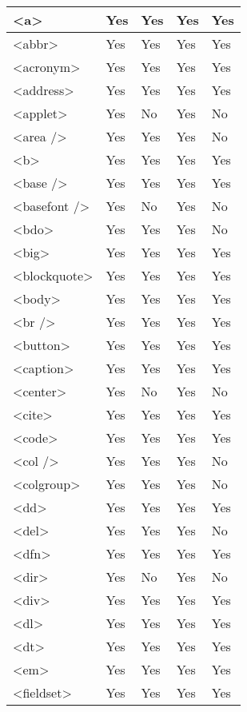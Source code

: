 \begin{longtable}{|p{70pt}|p{70pt}|p{70pt}|p{70pt}|p{70pt}|}
\endlastfoot
\hline
<a>					&Yes			&Yes	&Yes				&Yes	\\
\hline
<abbr>				&Yes			&Yes	&Yes				&Yes	\\
\hline
<acronym>			&Yes			&Yes	&Yes				&Yes	\\
\hline
<address>			&Yes			&Yes	&Yes				&Yes	\\
\hline
<applet>				&Yes			&No		&Yes				&No		\\
\hline
<area />				&Yes			&Yes	&Yes				&No		\\
\hline
<b>					&Yes			&Yes	&Yes				&Yes	\\
\hline
<base />				&Yes			&Yes	&Yes				&Yes	\\
\hline
<basefont />			&Yes			&No		&Yes				&No		\\
\hline
<bdo>				&Yes			&Yes	&Yes				&No		\\
\hline
<big>				&Yes			&Yes	&Yes				&Yes	\\
\hline
<blockquote>			&Yes			&Yes	&Yes				&Yes	\\
\hline
<body>				&Yes			&Yes	&Yes				&Yes	\\
\hline
<br />				&Yes			&Yes	&Yes				&Yes	\\
\hline
<button>				&Yes			&Yes	&Yes				&Yes	\\
\hline
<caption>				&Yes			&Yes	&Yes				&Yes	\\
\hline
<center>				&Yes			&No		&Yes				&No		\\
\hline
<cite>				&Yes			&Yes	&Yes				&Yes	\\
\hline
<code>				&Yes			&Yes	&Yes				&Yes	\\
\hline
<col />				&Yes			&Yes	&Yes				&No		\\
\hline
<colgroup>			&Yes			&Yes	&Yes				&No		\\
\hline
<dd>				&Yes			&Yes	&Yes				&Yes	\\
\hline
<del>				&Yes			&Yes	&Yes				&No		\\
\hline
<dfn>				&Yes			&Yes	&Yes				&Yes	\\
\hline
<dir>				&Yes			&No		&Yes				&No		\\
\hline
<div>				&Yes			&Yes	&Yes				&Yes	\\
\hline
<dl>					&Yes			&Yes	&Yes				&Yes	\\
\hline
<dt>					&Yes			&Yes	&Yes				&Yes	\\
\hline
<em>				&Yes			&Yes	&Yes				&Yes	\\
\hline
<fieldset>			&Yes			&Yes	&Yes				&Yes	\\

\end{longtable}
